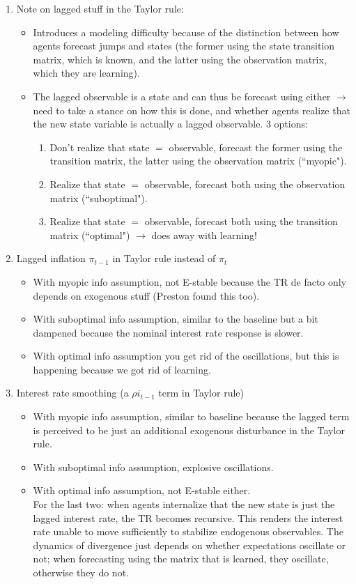 \documentclass[11pt]{article}
\renewcommand{\[}{\begin{equation}}
\renewcommand{\]}{\end{equation}}
\begin{document}
\begin{enumerate}
\begin{enumerate}
\item Note on lagged stuff in the Taylor rule:
\begin{itemize}
\item Introduces a modeling difficulty because of the distinction between how agents forecast jumps and states (the former using the state transition matrix, which is known, and the latter using the observation matrix, which they are learning).
\item The lagged observable is a state and can thus be forecast using either $\rightarrow$ need to take a stance on how this is done, and whether agents realize that the new state variable is actually a lagged observable. 3 options:
\begin{enumerate}
\item Don't realize that state $=$ observable, forecast the former using the transition matrix, the latter using the observation matrix (``myopic").
\item Realize that state $=$ observable, forecast both using the observation matrix (``suboptimal").
\item Realize that state $=$ observable, forecast both using the transition matrix (``optimal") $\rightarrow$ does away with learning!
\end{enumerate}

\end{itemize}
\item Lagged inflation $\pi_{t-1}$ in Taylor rule instead of $\pi_t$
\begin{itemize}
\item With myopic info assumption, not E-stable because the TR de facto only depends on exogenous stuff (Preston found this too).
\item With suboptimal info assumption, similar to the baseline but a bit dampened because the nominal interest rate response is slower.
\item With optimal info assumption you get rid of the oscillations, but this is happening because we got rid of learning.
\end{itemize}

\item Interest rate smoothing (a $\rho i_{t-1}$ term in Taylor rule)
\begin{itemize}
\item With myopic info assumption, similar to baseline because the lagged term is perceived to be just an additional exogenous disturbance in the Taylor rule.
\item With suboptimal info assumption, explosive oscillations.
\item With optimal info assumption, not E-stable either.  \\
For the last two: when agents internalize that the new state is just the lagged interest rate, the TR becomes recursive. This renders the interest rate unable to move sufficiently to stabilize endogenous observables. The dynamics of divergence just depends on whether expectations oscillate or not; when forecasting using the matrix that is learned, they oscillate, otherwise they do not. 
\end{itemize}
\end{enumerate}

\end{enumerate}
\end{document}
